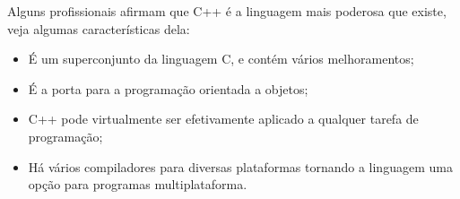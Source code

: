 Alguns profissionais afirmam que C++ é a linguagem mais poderosa que existe, veja algumas características dela:

\begin{itemize}
\item É um superconjunto da linguagem C, e contém vários melhoramentos;
\item É a porta para a programação orientada a objetos;
\item C++ pode virtualmente ser efetivamente aplicado a qualquer tarefa de programação;
\item Há vários compiladores para diversas plataformas tornando a linguagem uma opção para programas multiplataforma.
\end{itemize}

